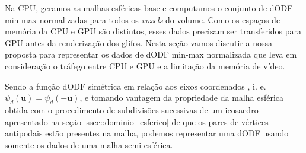 
Na CPU, geramos as malhas esféricas base e computamos o conjunto de dODF min-max normalizadas para todos os \textit{voxels} do volume. Como os espaços de memória da CPU e GPU são distintos, esses dados precisam ser transferidos para GPU antes da renderização dos glifos. Nesta seção vamos discutir a nossa proposta para representar os dados de dODF min-max normalizada que leva em consideração o tráfego entre CPU e GPU e a limitação da memória de vídeo.



Sendo a função dODF simétrica em relação aos eixos coordenados \cite{descoteaux2015}, i. e. $\psi_d(\mathbf{u}) = \psi_d(-\mathbf{u})$, e tomando vantagem da propriedade da malha esférica obtida com o procedimento de subdivisões sucessivas de um icosaedro apresentado na seção \ref{ssec::dominio_esferico} de que os pares de vértices antipodais estão presentes na malha, podemos representar uma dODF usando somente os dados de uma malha semi-esférica.


